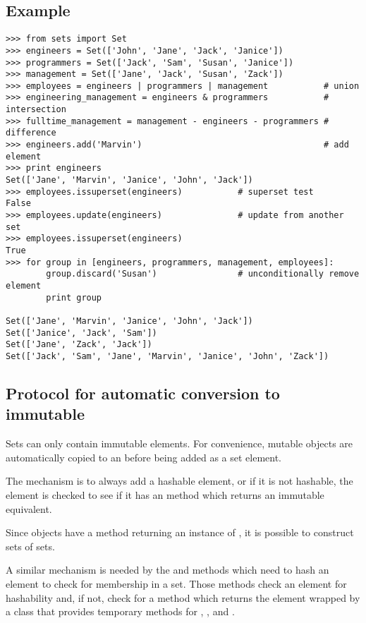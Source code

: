 \subsection{Example}

\begin{verbatim}
>>> from sets import Set
>>> engineers = Set(['John', 'Jane', 'Jack', 'Janice'])
>>> programmers = Set(['Jack', 'Sam', 'Susan', 'Janice'])
>>> management = Set(['Jane', 'Jack', 'Susan', 'Zack'])
>>> employees = engineers | programmers | management           # union
>>> engineering_management = engineers & programmers           # intersection
>>> fulltime_management = management - engineers - programmers # difference
>>> engineers.add('Marvin')                                    # add element
>>> print engineers
Set(['Jane', 'Marvin', 'Janice', 'John', 'Jack'])
>>> employees.issuperset(engineers)           # superset test
False
>>> employees.update(engineers)               # update from another set
>>> employees.issuperset(engineers)
True
>>> for group in [engineers, programmers, management, employees]:
        group.discard('Susan')                # unconditionally remove element
        print group

Set(['Jane', 'Marvin', 'Janice', 'John', 'Jack'])
Set(['Janice', 'Jack', 'Sam'])
Set(['Jane', 'Zack', 'Jack'])
Set(['Jack', 'Sam', 'Jane', 'Marvin', 'Janice', 'John', 'Zack'])
\end{verbatim}


\subsection{Protocol for automatic conversion to immutable
            \label{immutable-transforms}}

Sets can only contain immutable elements.  For convenience, mutable
 objects are automatically copied to an 
before being added as a set element.

The mechanism is to always add a hashable element, or if it is not
hashable, the element is checked to see if it has an
 method which returns an immutable equivalent.

Since  objects have a  method
returning an instance of , it is possible to
construct sets of sets.

A similar mechanism is needed by the  and
 methods which need to hash an element to check
for membership in a set.  Those methods check an element for hashability
and, if not, check for a  method
which returns the element wrapped by a class that provides temporary
methods for , , and .

